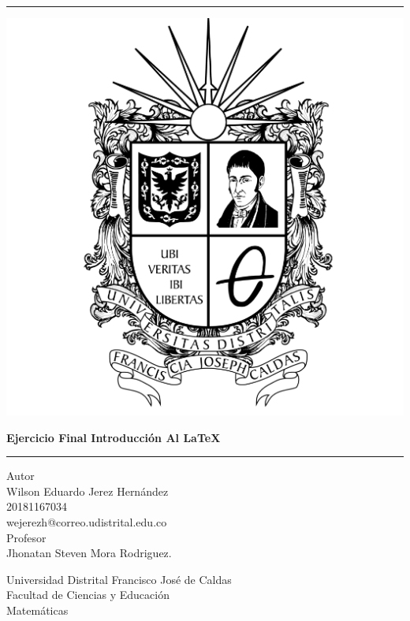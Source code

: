 \documentclass{article}
\numberwithin{equation}{section}
\theoremstyle{plain}  %
\begin{document}
\pagestyle{empty}
\begin{center}
\begin{figure}[h]
\centering


\end{figure}
\Large
\hrule
\vspace{4mm}
\begin{center}
    \includegraphics[scale=0.1]{ud.png}
\end{center}
\textbf{Ejercicio Final Introducción Al \LaTeX}\\

\vspace{4mm}
\hrule
\large
\vfill
Autor\\

Wilson Eduardo Jerez Hernández \\
20181167034\\ 
wejerezh@correo.udistrital.edu.co\\
\vfill
Profesor\\
Jhonatan Steven Mora Rodriguez.

\vfill
Universidad Distrital Francisco José de Caldas
\\
Facultad de Ciencias y Educación\\
Matemáticas \\
\end{center}
\newpage
\end{document}
